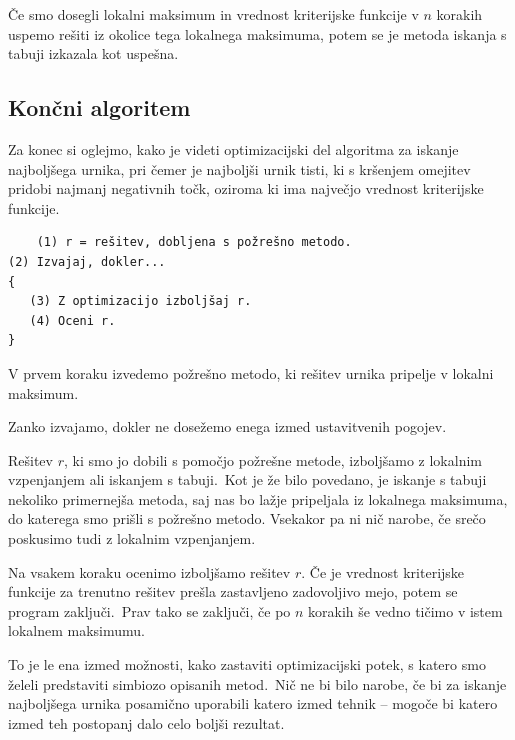 \documentclass[a4paper,10pt]{article}
\begin{document}
Če smo dosegli lokalni maksimum in vrednost kriterijske funkcije v $n$ korakih uspemo
rešiti iz okolice tega lokalnega maksimuma, potem se je metoda iskanja s tabuji izkazala
kot uspešna.

\subsection{Končni algoritem} %

Za konec si oglejmo, kako je videti optimizacijski del algoritma za iskanje najboljšega
urnika, pri čemer je najboljši urnik tisti, ki s kršenjem omejitev pridobi najmanj negativnih
točk, oziroma ki ima največjo vrednost kriterijske funkcije.

\begin{verbatim}
	(1) r = rešitev, dobljena s požrešno metodo.
(2) Izvajaj, dokler...
{
   (3) Z optimizacijo izboljšaj r.
   (4) Oceni r.
}
\end{verbatim}

   V prvem koraku izvedemo požrešno metodo, ki rešitev urnika pripelje v lokalni maksimum.

   Zanko izvajamo, dokler ne dosežemo enega izmed ustavitvenih pogojev.

   Rešitev $r$, ki smo jo dobili s pomočjo požrešne metode, izboljšamo z lokalnim vzpenjanjem
   ali iskanjem s tabuji.\ Kot je že bilo povedano, je iskanje s tabuji nekoliko primernejša metoda,
   saj nas bo lažje pripeljala iz lokalnega maksimuma, do katerega smo prišli s požrešno metodo.
   Vsekakor pa ni nič narobe, če srečo poskusimo tudi z lokalnim vzpenjanjem.

   Na vsakem koraku ocenimo izboljšamo rešitev $r$. Če je vrednost kriterijske funkcije
   za trenutno rešitev prešla zastavljeno zadovoljivo mejo, potem se program zaključi.\ Prav tako
   se zaključi, če po $n$ korakih še vedno tičimo v istem lokalnem maksimumu.

To je le ena izmed možnosti, kako zastaviti optimizacijski potek, s katero smo želeli predstaviti
simbiozo opisanih metod.\ Nič ne bi bilo narobe, če bi za iskanje najboljšega urnika posamično
uporabili katero izmed tehnik -- mogoče bi katero izmed teh postopanj dalo celo boljši rezultat.
\end{document}

